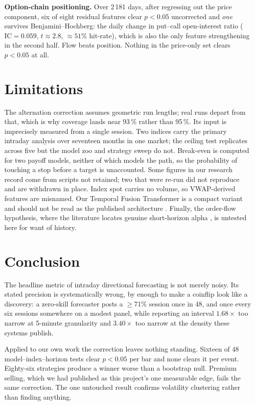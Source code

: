 \documentclass[conference]{IEEEtran}
\begin{document}
\textbf{Option-chain positioning.} Over 2\,181 days, after regressing out the
price component, six of eight residual features clear $p<0.05$ uncorrected and
\emph{one} survives Benjamini--Hochberg: the daily change in put--call
open-interest ratio ($\text{IC}=0.059$, $t\approx 2.8$, $\approx 51\%$
hit-rate), which is also the only feature strengthening in the second half.
Flow beats position. Nothing in the price-only set clears $p<0.05$ at all.

\section{Limitations}

The alternation correction assumes geometric run lengths; real runs depart from
that, which is why coverage lands near 93\,\% rather than 95\,\%. Its input is imprecisely measured from
a single session. Two indices carry the primary intraday analysis over seventeen
months in one market; the ceiling test replicates across five but the model zoo
and strategy sweep do not. Break-even is computed for two payoff models, neither
of which models the path, so the probability of touching a stop before a target
is unaccounted. Some figures in our research record come from scripts not
retained; two that were re-run did not reproduce and are withdrawn in place.
Index spot carries no volume, so VWAP-derived features are misnamed. Our
Temporal Fusion Transformer is a compact variant and should not be read as the
published architecture \cite{lim2021}. Finally, the order-flow hypothesis, where
the literature locates genuine short-horizon alpha \cite{kolm2023,zhang2019},
is untested here for want of history.

\section{Conclusion}

The headline metric of intraday directional forecasting is not merely noisy. Its
stated precision is systematically wrong, by enough to make a coinflip look like
a discovery: a zero-skill forecaster posts a $\geq$71\% session once in 48, and
once every six sessions somewhere on a modest panel, while reporting an
interval $1.68\times$ too narrow at 5-minute granularity and $3.40\times$ too
narrow at the density these systems publish.

Applied to our own work the correction leaves nothing standing. Sixteen of 48
model--index--horizon tests clear $p<0.05$ per bar and none clears it per event.
Eighty-six strategies produce a winner worse than a bootstrap null. Premium
selling, which we had published as this project's one measurable edge, fails the
same correction. The one untouched result confirms volatility clustering rather
than finding anything.
\end{document}
